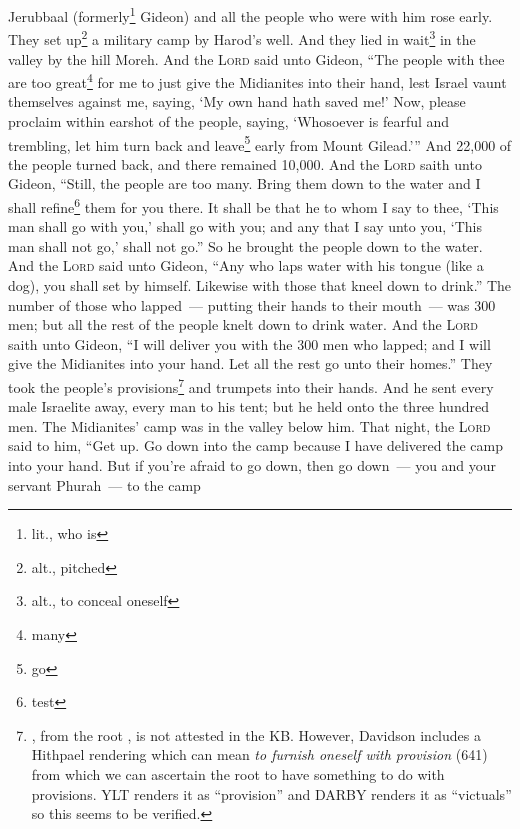 
\begin{inparaenum}
     Jerubbaal (formerly\footnote{lit., who is} Gideon) and all the people who were with him rose early. They set up\footnote{alt., pitched} a military camp by Harod's well. And they lied in wait\footnote{alt., to conceal oneself} in the valley by the hill Moreh.%
     And the \textsc{Lord} said unto Gideon, ``The people with thee are too great\footnote{many} for me to just give the Midianites into their hand, lest Israel vaunt themselves against me, saying, `My own hand hath saved me!'%
     Now, please proclaim within earshot of the people, saying, `Whosoever is fearful and trembling, let him turn back and leave\footnote{go} early from Mount Gilead.''' And 22,000 of the people turned back, and there remained 10,000.%
     And the \textsc{Lord} saith unto Gideon, ``Still, the people are too many. Bring them down to the water and I shall refine\footnote{test} them for you there. It shall be that he to whom I say to thee, `This man shall go with you,' shall go with you; and any that I say unto you, `This man shall not go,' shall not go.''%
     So he brought the people down to the water. And the \textsc{Lord} said unto Gideon, ``Any who laps water with his tongue (like a dog), you shall set by himself. Likewise with those that kneel down to drink.''%
     The number of those who lapped~--- putting their hands to their mouth~--- was 300 men; but all the rest of the people knelt down to drink water.%
     And the \textsc{Lord} saith unto Gideon, ``I will deliver you with the 300 men who lapped; and I will give the Midianites into your hand. Let all the rest go unto their homes.''%
     They took the people's provisions\footnote{, from the root , is not attested in the KB. However, Davidson includes a Hithpael rendering which can mean \textit{to furnish oneself with provision} (641) from which we can ascertain the root to have something to do with provisions. YLT renders it as ``provision'' and DARBY renders it as ``victuals'' so this seems to be verified.} and trumpets into their hands. And he sent every male Israelite away, every man to his tent; but he held onto the three hundred men. The Midianites' camp was in the valley below him.%
     That night, the \textsc{Lord} said to him, ``Get up. Go down into the camp because I have delivered the camp into your hand.%
     But if you're afraid to go down, then go down~--- you and your servant Phurah~--- to the camp%

\end{inparaenum}
